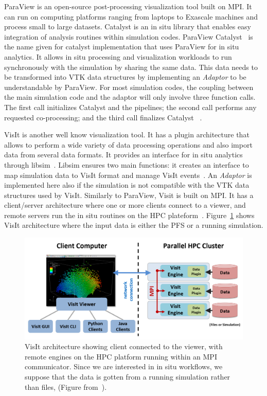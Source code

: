 ParaView is an open-source post-processing visualization tool built on MPI. It can run on computing platforms ranging from laptops to Exascale machines and process small to large datasets. Catalyst is an in situ library that enables easy integration of analysis routines within simulation codes.
ParaView Catalyst~\cite{bauer_paraview_2016, noauthor_using_paraview, noauthor_paraview_nodate, cscsch_situ_2022, ayachit2021catalyst} is the name given for catalyst implementation that uses ParaView for in situ analytics. It allows in situ processing and visualization workloads to run synchronously with the simulation by sharing the same data. This data needs to be transformed into VTK data structures by implementing an \textit{Adaptor} to be understandable by ParaView. 
For most simulation codes, the coupling between the main simulation code and the adaptor will only
involve three function calls. The first call initializes Catalyst and the pipelines; the second call performs any
requested co-processing; and the third call finalizes Catalyst
~\cite{catalyst, paraview_catalyst_examples_2022}.

VisIt is another well know visualization tool. It has a plugin architecture that allows to perform a wide variety of data processing operations and also import data from several data formats. It provides an interface for in situ analytics through libsim~\cite{childs_situ_libsim_2022}. Libsim ensures two main functions: it creates an interface  to map simulation data to VisIt format and manage VisIt events~\cite{ dreher_methodes_2015}.
An \textit{Adaptor} is implemented here also if the simulation is not compatible with the VTK data structures used by VisIt. 
Similarly to ParaView, Visit is built on MPI. It has a client/server architecture where one or more clients connect to a viewer, and remote servers run the in situ routines on the HPC plateform~\cite{noauthor_visit_works}. Figure~\ref{figvisit} shows VisIt architecture where the input data is either the PFS or a running simulation.

\begin{figure}[h!]\centering
\includegraphics[scale=0.5]{figures/Visit-Architecture.png}
\caption{VisIt architecture showing client connected to the viewer, with remote engines on the HPC platform running within an MPI communicator. Since we are interested in in situ workflows, we suppose that the data is gotten from a running simulation rather than files, (Figure from~\cite{noauthor_visit_works}).}
\label{figvisit}
\end{figure}

